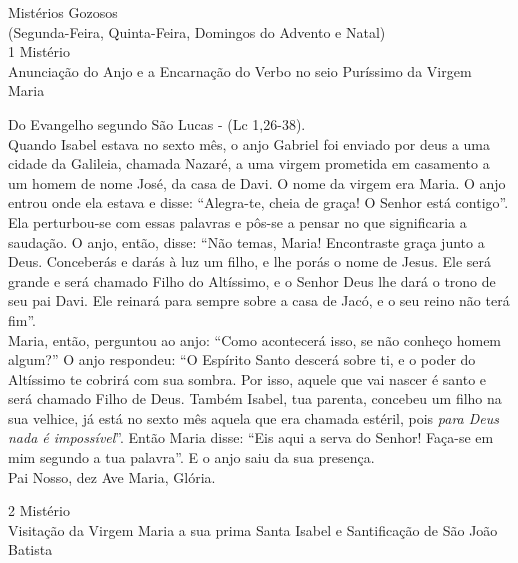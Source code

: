 \newpage
\begin{center}
    Mistérios Gozosos \\ \textcolor{VioletRed2}{\scriptsize{(Segunda-Feira, Quinta-Feira, Domingos do Advento e Natal)}} \\
    \hfill{} \break{}
    1\textordmasculine{} Mistério \\ Anunciação do Anjo e a Encarnação do Verbo no seio Puríssimo da Virgem Maria
\end{center}
\begin{flushleft}
    Do Evangelho segundo São Lucas - (\textcolor{VioletRed2}{Lc 1,26-38}). \\
    \hfill{} \break{}
    Quando Isabel estava no sexto mês, o anjo Gabriel foi enviado por deus a uma cidade da Galileia, chamada Nazaré, a uma virgem prometida em casamento a um homem de nome José, da casa de Davi. O nome da virgem era Maria. O anjo entrou onde ela estava e disse: ``Alegra-te, cheia de graça! O Senhor está contigo''. Ela perturbou-se com essas palavras e pôs-se a pensar no que significaria a saudação. O anjo, então, disse: ``Não temas, Maria! Encontraste graça junto a Deus. Conceberás e darás à luz um filho, e lhe porás o nome de Jesus. Ele será grande e será chamado Filho do Altíssimo, e o Senhor Deus lhe dará o trono de seu pai Davi. Ele reinará para sempre sobre a casa de Jacó, e o seu reino não terá fim''.
    \vspace{.2cm} \\
    Maria, então, perguntou ao anjo: ``Como acontecerá isso, se não conheço homem algum?'' O anjo respondeu: ``O Espírito Santo descerá sobre ti, e o poder do Altíssimo te cobrirá com sua sombra. Por isso, aquele que vai nascer é santo e será chamado Filho de Deus. Também Isabel, tua parenta, concebeu um filho na sua velhice, já está no sexto mês aquela que era chamada estéril, pois \textit{para Deus nada é impossível}''. Então Maria disse: ``Eis aqui a serva do Senhor! Faça-se em mim segundo a tua palavra''. E o anjo saiu da sua presença. \\
    \hfill{} \break{}
    Pai Nosso, dez Ave Maria, Glória.
\end{flushleft}
\newpage
\begin{center}
    2\textordmasculine{} Mistério \\ Visitação da Virgem Maria a sua prima Santa Isabel e Santificação de São João Batista
\end{center}
